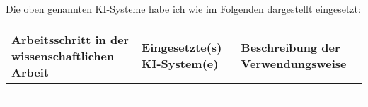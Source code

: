 {Die oben genannten KI-Systeme habe ich wie im Folgenden dargestellt eingesetzt: 


\begin{tabular}{|p{4cm}|p{3cm}|p{7cm}|}
    \hline
    \textbf{Arbeitsschritt in der wissenschaftlichen Arbeit} &
%
%
%
    \textbf{Eingesetzte(s) KI-System(e)} & \textbf{Beschreibung der Verwendungsweise} \\
    \hline
    & & \\ %
    \hline
    & & \\ %
    \hline
    & & \\
    \hline
    & & \\
    \hline
  \end{tabular}
} %
